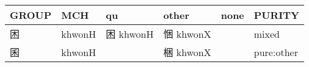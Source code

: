 \documentclass[14pt,a4paper]{scrartcl}
\begin{document}
\begin{longtable}[c]{@{}llllll@{}}
\toprule
\begin{minipage}[b]{0.14\columnwidth}\raggedright\strut
GROUP
\strut\end{minipage} &
\begin{minipage}[b]{0.14\columnwidth}\raggedright\strut
MCH
\strut\end{minipage} &
\begin{minipage}[b]{0.14\columnwidth}\raggedright\strut
qu
\strut\end{minipage} &
\begin{minipage}[b]{0.14\columnwidth}\raggedright\strut
other
\strut\end{minipage} &
\begin{minipage}[b]{0.14\columnwidth}\raggedright\strut
none
\strut\end{minipage} &
\begin{minipage}[b]{0.14\columnwidth}\raggedright\strut
PURITY
\strut\end{minipage}\tabularnewline
\midrule
\endhead
\begin{minipage}[t]{0.14\columnwidth}\raggedright\strut
困
\strut\end{minipage} &
\begin{minipage}[t]{0.14\columnwidth}\raggedright\strut
khwonH
\strut\end{minipage} &
\begin{minipage}[t]{0.14\columnwidth}\raggedright\strut
困 khwonH
\strut\end{minipage} &
\begin{minipage}[t]{0.14\columnwidth}\raggedright\strut
悃 khwonX
\strut\end{minipage} &
\begin{minipage}[t]{0.14\columnwidth}\raggedright\strut
\strut\end{minipage} &
\begin{minipage}[t]{0.14\columnwidth}\raggedright\strut
mixed
\strut\end{minipage}\tabularnewline
\begin{minipage}[t]{0.14\columnwidth}\raggedright\strut
囷
\strut\end{minipage} &
\begin{minipage}[t]{0.14\columnwidth}\raggedright\strut
khwonH
\strut\end{minipage} &
\begin{minipage}[t]{0.14\columnwidth}\raggedright\strut
\strut\end{minipage} &
\begin{minipage}[t]{0.14\columnwidth}\raggedright\strut
梱 khwonX
\strut\end{minipage} &
\begin{minipage}[t]{0.14\columnwidth}\raggedright\strut
\strut\end{minipage} &
\begin{minipage}[t]{0.14\columnwidth}\raggedright\strut
pure:other
\strut\end{minipage}\tabularnewline
\bottomrule
\end{longtable}
\end{document}
